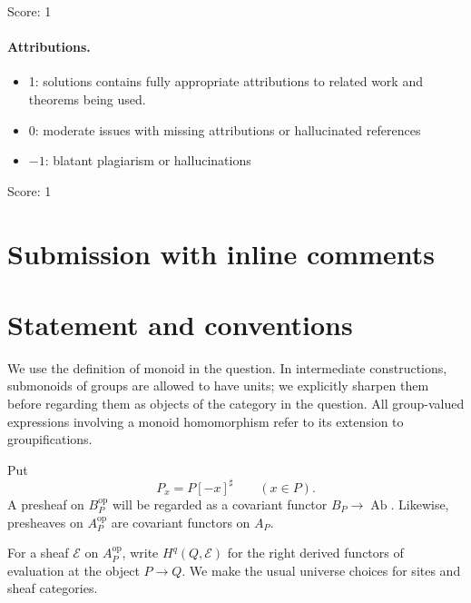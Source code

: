 \documentclass[11pt]{article}
\theoremstyle{definition}
\theoremstyle{remark}
\DeclareMathOperator{\Ab}{Ab}
\begin{document}
\noindent Score: 1

\paragraph{Attributions.}
\begin{itemize}
	\item  1: solutions contains fully appropriate attributions
		to related work and theorems being used.
	\item  0: moderate issues with missing attributions or hallucinated references
	\item  $-1$: blatant plagiarism or hallucinations
\end{itemize}

\noindent Score: 1

\newpage
\section{Submission with inline comments}


\begin{abstract}
The answer to the question is affirmative, without a finite-generation
hypothesis on the monoid. We prove a stronger statement: the presheaf
left Kan extension of the given presheaf is already a birhizomic sheaf
and is acyclic on every object of the birhizomic site. The proof uses
finite refinements of birhizomic covers, a finite convex-cover
calculation, and passage to filtered unions of finitely generated
saturated monoids.
\end{abstract}

\section{Statement and conventions}

We use the definition of monoid in the question. In intermediate
constructions, submonoids of groups are allowed to have units; we
explicitly sharpen them before regarding them as objects of the
category in the question. All group-valued expressions involving a
monoid homomorphism refer to its extension to groupifications.

Put
\[
P_x=P[-x]^\sharp\qquad(x\in P).
\]
A presheaf on \(B_P^{\mathrm{op}}\) will be regarded as a covariant
functor \(B_P\to\Ab\). Likewise, presheaves on \(A_P^{\mathrm{op}}\)
are covariant functors on \(A_P\).

For a sheaf \(\mathcal E\) on \(A_P^{\mathrm{op}}\), write
\(H^q(Q,\mathcal E)\) for the right derived functors of evaluation at
the object \(P\to Q\). We make the usual universe choices for sites
and sheaf categories.
\end{document}
